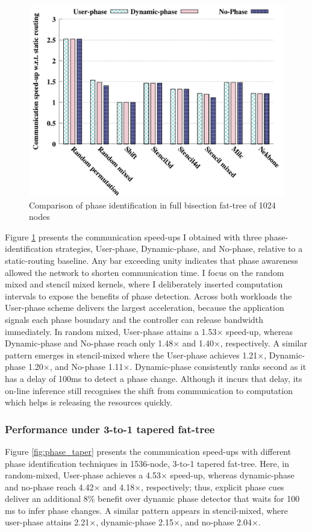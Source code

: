 \begin{figure}[h]
  \centering
  \includegraphics[width=\columnwidth]{./figs_4/phase_full.pdf}
  \caption{Comparison of phase identification in full bisection fat-tree of 1024 nodes}
  \label{fig:phase_full}
\end{figure}
Figure \ref{fig:phase_full} presents the communication speed-ups I obtained with three phase-identification strategies, User-phase, Dynamic-phase, and No-phase, relative to a static-routing baseline. 
Any bar exceeding unity indicates that phase awareness allowed the network to shorten communication time. 
I focus on the random mixed and stencil mixed kernels, where I deliberately inserted computation intervals to expose the benefits of phase detection. Across both workloads the User-phase scheme delivers the largest acceleration, because the application signals each phase boundary and the controller can release bandwidth immediately. 
In random mixed, User-phase attains a 1.53× speed-up, whereas Dynamic-phase and No-phase reach only 1.48× and 1.40×, respectively. A similar pattern emerges in stencil-mixed where the User-phase achieves 1.21×, Dynamic-phase 1.20×, and No-phase 1.11×. Dynamic-phase consistently ranks second as it has a delay of 100ms to detect a phase change. Although it incurs that delay, its on-line inference still recognises the shift from communication to computation which helps is releasing the resources quickly. 

\subsubsection{Performance under 3-to-1 tapered fat-tree}
Figure \ref{fig:phase_taper} presents the communication speed-ups with different phase identification techniques in 1536-node, 3-to-1 tapered fat-tree. Here, in random-mixed, User-phase achieves a 4.53× speed-up, whereas dynamic-phase and no-phase reach 4.42× and 4.18×, respectively; thus, explicit phase cues deliver an additional 8\% benefit over dynamic phase detector that waits for 100 ms to infer phase changes. A similar pattern appears in stencil-mixed, where user-phase attains 2.21×, dynamic-phase 2.15×, and no-phase 2.04×. 

